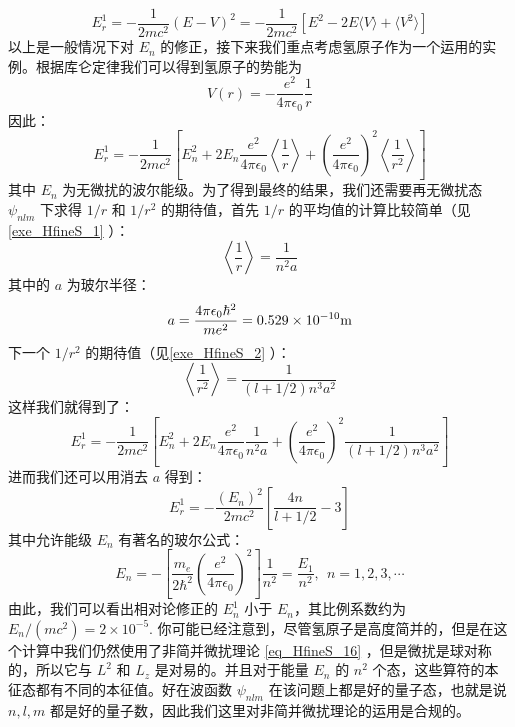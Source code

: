 \begin{equation}
E_r^1=-\frac{1}{2mc^2}(E-V)^2=-\frac{1}{2mc^2}[E^2-2E\langle V\rangle+\langle V^2\rangle]
\end{equation}
以上是一般情况下对 $E_n$ 的修正，接下来我们重点考虑氢原子作为一个运用的实例。根据库仑定律我们可以得到氢原子的势能为
\begin{equation}
V(r)=-\frac{e^2}{4\pi\epsilon_0}\frac{1}{r}
\end{equation}
因此：
\begin{equation}
E_r^1=-\frac{1}{2mc^2}\left[E_n^2+2E_n\frac{e^2}{4\pi\epsilon_0}\left\langle \frac{1}{r}\right\rangle+\left(\frac{e^2}{4\pi\epsilon_0}\right)^2\left\langle \frac{1}{r^2}\right\rangle\right]
\end{equation}
其中 $E_n$ 为无微扰的波尔能级。为了得到最终的结果，我们还需要再无微扰态 $\psi_{nlm}$ 下求得 $1/r$ 和 $1/r^2$ 的期待值，首先 $1/r$ 的平均值的计算比较简单（见\autoref{exe_HfineS_1} ）：
\begin{equation}
\left\langle\frac{1}{r}\right\rangle = \frac{1}{n^2a}
\end{equation}
其中的 $a$ 为玻尔半径：
\begin{equation}
a=\frac{4\pi\epsilon_0\hbar^2}{me^2}=0.529\times 10^{-10}\rm{m}
\end{equation}
下一个 $1/r^2$ 的期待值（见\autoref{exe_HfineS_2} ）：
\begin{equation}
\left\langle \frac{1}{r^2}\right\rangle = \frac{1}{(l+1/2)n^3a^2}
\end{equation}
这样我们就得到了：
\begin{equation}
E_r^1=-\frac{1}{2mc^2}\left[E_n^2+2E_n\frac{e^2}{4\pi\epsilon_0}\frac{1}{n^2a}+\left(\frac{e^2}{4\pi\epsilon_0}\right)^2\frac{1}{(l+1/2)n^3a^2}\right]
\end{equation}
进而我们还可以用消去 $a$ 得到：
\begin{equation}\label{eq_HfineS_21}
E_r^1=-\frac{(E_n)^2}{2mc^2}\left[\frac{4n}{l+1/2}-3\right]
\end{equation}
其中允许能级 $E_n$ 有著名的玻尔公式：
\begin{equation}
E_{n} =-\left[\frac {m_e}{2\hbar^{2}} \left(\frac {e^ {2}}{4\pi \epsilon_0}\right)^ {2}\right]  \frac {1}{n^ {2}}  =  \frac {E_ {1}}{n^ {2}}, \ \  n=1,2,3, \cdots 
\end{equation}
由此，我们可以看出相对论修正的 $E^1_n$ 小于 $E_n$，其比例系数约为 $E_n/(mc^2)=2\times 10^{-5}$.
你可能已经注意到，尽管氢原子是高度简并的，但是在这个计算中我们仍然使用了非简并微扰理论 \autoref{eq_HfineS_16} ，但是微扰是球对称的，所以它与 $L^2$ 和 $L_z$ 是对易的。并且对于能量 $E_n$ 的 $n^2$ 个态，这些算符的本征态都有不同的本征值。好在波函数 $\psi_{nlm}$ 在该问题上都是好的量子态，也就是说 $n,l,m$ 都是好的量子数，因此我们这里对非简并微扰理论的运用是合规的。

